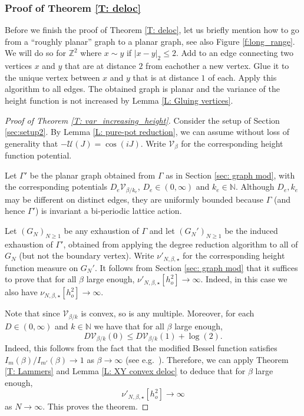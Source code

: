 \documentclass[11pt, reqno]{amsart}
\numberwithin{equation}{section}
\theoremstyle{definition}
\theoremstyle{remark}
\newcommand{\ZZ}{\mathbb{Z}}
\newcommand{\NN}{\mathbb{N}}
\renewcommand{\c}[1]{\ensuremath{\mathcal{#1}}}
\newcommand{\J}{J}
\newcommand{\exact}{\star}
\begin{document}
\subsubsection{Proof of Theorem \ref{T: deloc}}
Before we finish the proof of Theorem \ref{T: deloc}, let us briefly mention how to go from a ``roughly planar'' graph to a planar graph, see also Figure \ref{f:long_range}. 
We will do so for $\ZZ^2$ where $x \sim y$ if $|x - y|_2 \leq 2$. 
Add to an edge connecting two vertices $x$ and $y$ that are at distance $2$ from eachother a new vertex. 
Glue it to the unique vertex between $x$ and $y$ that is at distance $1$ of each. 
Apply this algorithm to all edges. The obtained graph is planar and the variance of the height function is not increased by Lemma \ref{L: Gluing vertices}. 

\begin{proof}[Proof of Theorem \ref{T: var_increasing_height}]
	Consider the setup of Section \ref{sec:setup2}. 
	By Lemma \ref{L: pure-pot reduction}, we can assume without loss of generality that $-\c{U}(\J) = \cos(i\J)$.  
	Write $\c{V}_{\beta}$ for the corresponding height function potential. 
	
	Let $\Gamma'$ be the planar graph obtained from $\Gamma$ as in Section \ref{sec: graph mod}, with the corresponding potentials $D_e\c{V}_{\beta / k_e}$, 
	$D_e \in (0, \infty)$ and $k_e \in \NN$. 
	Although $D_e, k_e$ may be different on distinct edges, they are uniformly bounded because $\Gamma$ (and hence $\Gamma'$) is invariant a bi-periodic lattice action. 
	
	Let $(G_N)_{N \geq 1}$ be any exhaustion of $\Gamma$ and let $(G_N')_{N \geq 1}$ be the induced exhaustion of $\Gamma'$, obtained from applying the degree reduction algorithm to all of $G_N$ (but not the boundary vertex). 
	Write $\nu'_{N, \beta, \exact}$ for the corresponding height function measure on $G_N'$. 
	It follows from Section \ref{sec: graph mod} that it suffices to prove that for all $\beta$ large enough, $\nu'_{N, \beta, \exact}[h_o^2] \to \infty$. 
	Indeed, in this case we also have $\nu_{N, \beta, \exact}[h_o^2] \to \infty$. 
	
	Note that since $\c{V}_{\beta / k}$ is convex, so is any multiple. 
	Moreover, for each $D \in (0, \infty)$ and $k \in \NN$ we have that for all $\beta$ large enough, 
	\[
		D\c{V}_{\beta / k}(0) \leq D\c{V}_{\beta / k}(1) + \log(2). 
	\]
	Indeed, this follows from the fact that the modified Bessel function satisfies $I_{m}(\beta) / I_{m'}(\beta) \to 1$ as $\beta \to \infty$ (see e.g.~\cite{vEnLis}). 
	Therefore, we can apply Theorem \ref{T: Lammers} and Lemma \ref{L: XY convex deloc} to deduce that for $\beta$ large enough, 
	\[
		\nu'_{N, \beta, \exact}[h_o^2] \to \infty
	\]
	as $N \to \infty$. 
	This proves the theorem. 
\end{proof}
\end{document}
